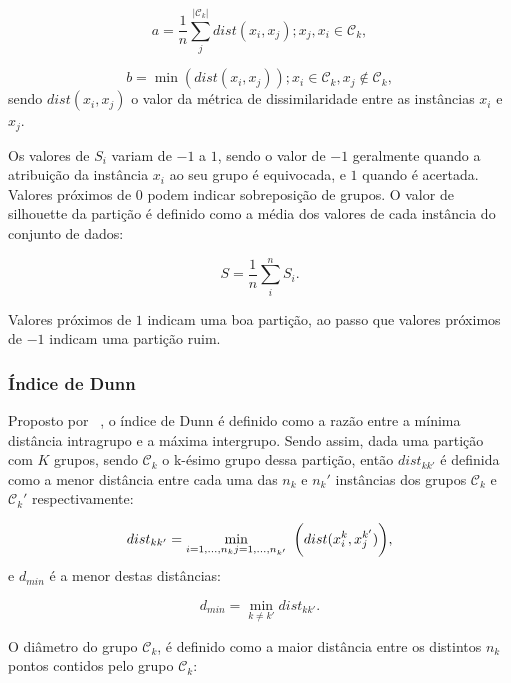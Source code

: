 \begin{equation}
a = \frac{1}{n} \sum_{j}^{|\mathcal{C}_k|} dist(x_i,x_j); x_j, x_i \in \mathcal{C}_k,
\end{equation}

\begin{equation}
b =\min(dist(x_i,x_j)); x_i \in \mathcal{C}_k,  x_j \notin \mathcal{C}_k,
\end{equation}
sendo $dist(x_i,x_j)$ o valor da métrica de dissimilaridade entre as instâncias $x_i$ e $x_j$.

Os valores de $S_i$ variam de $-1$ a $1$, sendo o valor de $-1$ geralmente quando a atribuição da instância $x_i$ ao seu grupo é equivocada, e $1$ quando é acertada. Valores próximos de $0$ podem indicar sobreposição de grupos. O valor de silhouette da partição é definido como a média dos valores de cada instância do conjunto de dados:

\begin{equation}
S = \frac{1}{n} \sum_{i}^{n} S_i.
\end{equation}

Valores próximos de $1$ indicam uma boa partição, ao passo que valores próximos de $-1$ indicam uma partição ruim.

\subsubsection{Índice de Dunn}

Proposto por ~\parencite{Dunn}, o índice de Dunn é definido como a razão entre a mínima distância intragrupo e a máxima intergrupo. Sendo assim, dada uma partição com $K$ grupos, sendo $\mathcal{C}_k$ o k-ésimo grupo dessa partição, então $dist_{kk'}$ é definida como a menor distância entre cada uma das  $n_k$ e $n_k'$ instâncias dos grupos $\mathcal{C}_k$ e $\mathcal{C}_k'$ respectivamente:

\begin{equation}
dist_{kk'} = \min_{i=1,...,n_k\\j=1,...,n_{k'}} \text{			} \bigg(dist(x_{i}^{k},x_{j}^{k'})\bigg),
\end{equation}
e $d_{min}$ é a menor destas distâncias:

\begin{equation}
d_{min} = \min_{k \neq k'} dist_{kk'}.
\end{equation}

O diâmetro do grupo $\mathcal{C}_k$, é definido como a maior distância entre os distintos $n_k$ pontos contidos pelo grupo $\mathcal{C}_k$:

